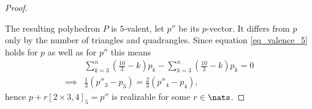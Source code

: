 \begin{theorem}
\begin{proof}
\begin{figure}[hptt]
   \end{figure}
   The resulting polyhedron $P$ is $5$-valent, let $p''$ be its $p$-vector. It differs from $p$ only by the number of triangles and quadrangles. Since equation \ref{eq_valence_5} holds for $p$ as well as for $p''$ this means
   \begin{align*}
     & \sum_{k=3}^n \left( \frac{10}{3} - k \right) p_k - \sum_{k=3}^n \left( \frac{10}{3} - k \right) p_k = 0 \\
     \implies& \frac{1}{3} (p''_3 - p_3) = \frac{2}{3} (p''_4 - p_4),
   \end{align*}
   hence $p + r [2 \times 3, 4]_5 = p''$ is realizable for some $r \in \nats$.
  \end{proof}
\end{theorem}

